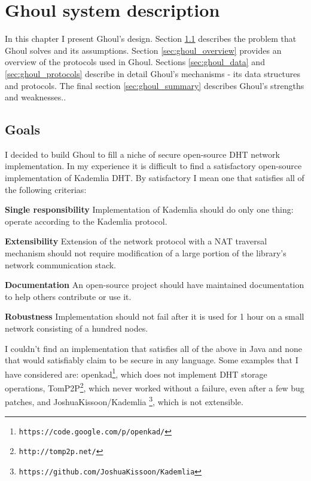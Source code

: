 \chapter{Ghoul system description}

In this chapter I present Ghoul's design. Section \ref{sec:ghoul_goals}
describes the problem that Ghoul solves and its assumptions. Section
\ref{sec:ghoul_overview} provides an overview of the protocols used in Ghoul.
Sections \ref{sec:ghoul_data} and \ref{sec:ghoul_protocols} describe in detail
Ghoul's mechanisms - its data structures and protocols. The final section
\ref{sec:ghoul_summary} describes Ghoul's strengths and weaknesses..

\section{Goals}
\label{sec:ghoul_goals}
I decided to build Ghoul to fill a niche of secure open-source DHT network
implementation. In my experience it is difficult to find a satisfactory
open-source implementation of Kademlia DHT. By satisfactory I mean one that
satisfies all of the following criterias:

\begin{description}
  \item{\textbf{Single responsibility}} Implementation of Kademlia should do
    only one thing: operate according to the Kademlia protocol.
  \item{\textbf{Extensibility}} Extension of the network protocol with a
    NAT traversal mechanism should not require modification of a large portion
    of the library's network communication stack.
  \item{\textbf{Documentation}} An open-source project should have maintained
    documentation to help others contribute or use it.
  \item{\textbf{Robustness}} Implementation should not fail after it is used
    for 1 hour on a small network consisting of a hundred nodes.
\end{description}

I couldn't find an implementation that satisfies all of the above in Java and
none that would satisfiably claim to be secure in any language. Some examples
that I have considered are:
openkad\footnote{\texttt{https://code.google.com/p/openkad/}}, which does not
implement DHT storage operations, TomP2P\footnote{\texttt{http://tomp2p.net/}},
which never worked without a failure, even after a few bug patches, and
JoshuaKissoon/Kademlia
\footnote{\texttt{https://github.com/JoshuaKissoon/Kademlia}}, which is not
extensible.

